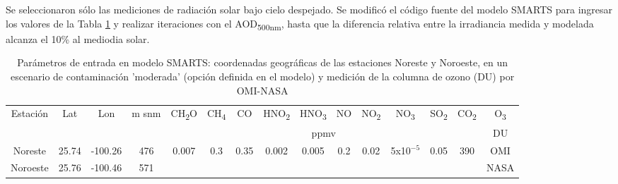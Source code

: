 \documentclass{article}
\begin{document}
\begin{minipage}{0.75\linewidth}
Se seleccionaron sólo las mediciones de radiación solar bajo cielo despejado. Se modificó el código fuente del modelo 
SMARTS para ingresar los valores de la Tabla \ref{tabla:parametros} y realizar iteraciones con el AOD\textsubscript{500nm}, 
hasta que la diferencia relativa entre la irradiancia medida y modelada alcanza el 10\% al mediodia solar.
\begin{table}[H]
    \changefontsizes{9.5pt}
        \centering
    \begin{tabular}{|c|c|c|c|c|c|c|c|c|c|c|c|c|c|c|} \hline
         \multirow{2}{*}{Estación} & \multirow{2}{*}{Lat}& \multirow{2}{*}{Lon} & \multirow{2}{*}{m snm} & CH\textsubscript{2}O & CH\textsubscript{4}& CO & HNO\textsubscript{2} & HNO\textsubscript{3} & NO & NO\textsubscript{2} & NO\textsubscript{3} & SO\textsubscript{2} & CO\textsubscript{2}&O\textsubscript{3}\\ \cline{5-15}
                &       &   &  & \multicolumn{10}{c|}{ppmv}  & \multicolumn{1}{c|}{DU} \\ \hline
       Noreste &  25.74&-100.26&476   & \multirow{2}{*}{0.007} & \multirow{2}{*}{0.3}& \multirow{2}{*}{0.35}    &   \multirow{2}{*}{0.002}  &  \multirow{2}{*}{0.005} & \multirow{2}{*}{0.2} & \multirow{2}{*}{0.02} & \multirow{2}{*}{5x10$^{-5}$}  &\multirow{2}{*}{0.05} & \multirow{2}{*}{390}&OMI\\
        Noroeste &  25.76&-100.46&571  &  & & & &  &  &  & &  & & NASA\\\hline
    \end{tabular}
    \caption{ Parámetros de entrada en modelo SMARTS: coordenadas geográficas de las estaciones Noreste y Noroeste,
    en un escenario de contaminación ’moderada’ (opción definida en el modelo) y medición de la columna de ozono (DU) por OMI-NASA}
    \label{tabla:parametros}
\end{table}
\end{minipage}
\end{document}
